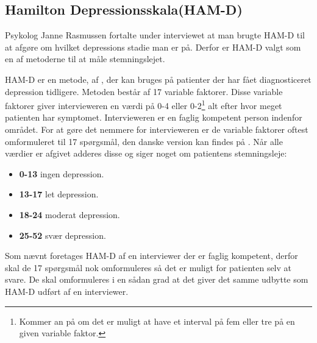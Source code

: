 \subsection{Hamilton Depressionsskala(HAM-D)}
Psykolog Janne Rasmussen fortalte under interviewet at man brugte HAM-D til at afgøre om hvilket depressions stadie man er på.\cite[Afsnit 1.3, Møde med Psykolog Janne Rasmussen]{faelles}
Derfor er HAM-D valgt som en af metoderne til at måle stemningslejet.

HAM-D er en metode, af \citet{ham_d}, der kan bruges på patienter der har fået diagnosticeret depression tidligere. 
Metoden består af 17 variable faktorer.
Disse variable faktorer giver intervieweren en værdi på 0-4 eller 0-2\footnote{Kommer an på om det er muligt at have et interval på fem eller tre på en given variable faktor.} alt efter hvor meget patienten har symptomet.
Intervieweren er en faglig kompetent person indenfor området.
For at gøre det nemmere for intervieweren er de variable faktorer oftest omformuleret til 17 spørgsmål, den danske version kan findes på \citet{ham_d_dansk}.
Når alle værdier er afgivet adderes disse og siger noget om patientens stemningsleje:
\begin{itemize}
	\item \textbf{0-13} ingen depression.
	\item \textbf{13-17} let depression.
	\item \textbf{18-24} moderat depression.
	\item \textbf{25-52} svær depression.
\end{itemize}

Som nævnt foretages HAM-D af en interviewer der er faglig kompetent, derfor skal de 17 spørgsmål nok omformuleres så det er muligt for patienten selv at svare.
De skal omformuleres i en sådan grad at det giver det samme udbytte som HAM-D udført af en interviewer.
